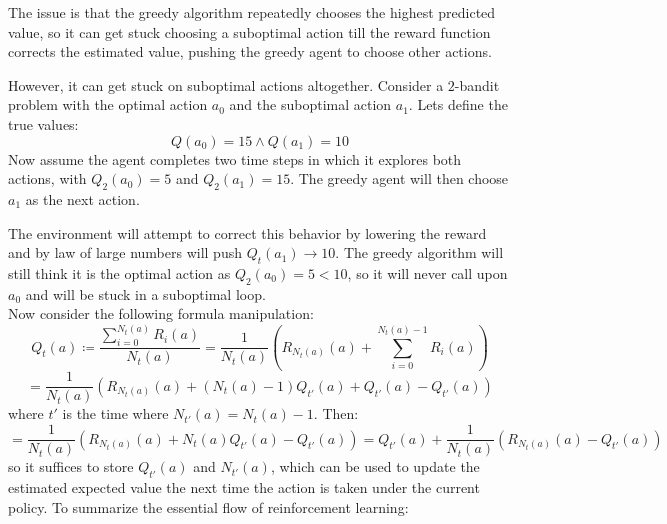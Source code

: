 \documentclass[Robotics.tex]{subfiles}
\begin{document}
The issue is that the greedy algorithm repeatedly chooses the highest predicted value, so it can get stuck choosing a suboptimal action till the reward function corrects the estimated value, pushing the greedy agent to choose other actions.

However, it can get stuck on suboptimal actions altogether. Consider a $2$-bandit problem with the optimal action $a_0$ and the suboptimal action $a_1$. Lets define the true values:
\begin{equation*}
Q(a_0) = 15 \land Q(a_1) = 10
\end{equation*}
Now assume the agent completes two time steps in which it explores both actions, with $Q_2(a_0) = 5$ and $Q_2(a_1) = 15$. The greedy agent will then choose $a_1$ as the next action.

The environment will attempt to correct this behavior by lowering the reward and by law of large numbers will push $Q_t(a_1) \xrightarrow{} 10$. The greedy algorithm will still think it is the optimal action as $Q_2(a_0) = 5 < 10$, so it will never call upon $a_0$ and will be stuck in a suboptimal loop.\\

Now consider the following formula manipulation:
\begin{equation*}
Q_t(a) \coloneq \frac{\sum_{i=0}^{N_t(a)}R_i(a)}{N_t(a)} = \frac{1}{N_t(a)}\left(R_{N_t(a)}(a) + \sum_{i= 0}^{N_t(a) - 1}R_i(a)\right)
\end{equation*}
\begin{equation*}
 = \frac{1}{N_t(a)}(R_{N_t(a)}(a) + (N_{t}(a) - 1)Q_{t'}(a) + Q_{t'}(a) - Q_{t'}(a))
\end{equation*}
where $t'$ is the time where $N_{t'}(a) = N_t(a) - 1$. Then:
\begin{equation*}
= \frac{1}{N_t(a)}(R_{N_t(a)}(a) + N_t(a)Q_{t'}(a) - Q_{t'}(a)) = Q_{t'}(a) + \frac{1}{N_t(a)}(R_{N_t(a)}(a) - Q_{t'}(a))
\end{equation*}
so it suffices to store $Q_{t'}(a)$ and $N_{t'}(a)$, which can be used to update the estimated expected value the next time the action is taken under the current policy. To summarize the essential flow of reinforcement learning:
\end{document}
